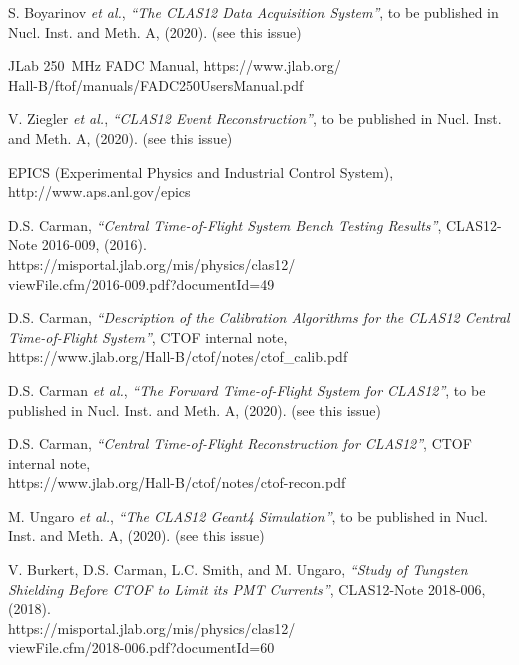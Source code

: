\documentclass[3p,times,twocolumn]{elsarticle}
\begin{document}
\begin{thebibliography}{99}
S. Boyarinov {\it et al.}, {\it ``The CLAS12 Data Acquisition System''}, to be published in Nucl. Inst.
and Meth. A, (2020). (see this issue)
  
JLab 250~MHz FADC Manual, https://www.jlab.org/\\ Hall-B/ftof/manuals/FADC250UsersManual.pdf
  
V. Ziegler {\it et al.}, {\it ``CLAS12 Event Reconstruction''}, to be published in Nucl. Inst.
and Meth. A, (2020). (see this issue)
  
EPICS (Experimental Physics and Industrial Control System), http://www.aps.anl.gov/epics

D.S. Carman, {\it ``Central Time-of-Flight System Bench Testing Results''},
CLAS12-Note 2016-009, (2016).\\
https://misportal.jlab.org/mis/physics/clas12/\\ viewFile.cfm/2016-009.pdf?documentId=49

D.S. Carman, {\it ``Description of the Calibration Algorithms for the CLAS12 Central Time-of-Flight System''},
CTOF internal note, \\
https://www.jlab.org/Hall-B/ctof/notes/ctof\_calib.pdf

D.S. Carman {\it et al.}, {\it ``The Forward Time-of-Flight System for CLAS12''}, to be published in Nucl.
Inst. and Meth. A, (2020). (see this issue)

D.S. Carman, {\it ``Central Time-of-Flight Reconstruction for CLAS12''}, CTOF internal note, \\
https://www.jlab.org/Hall-B/ctof/notes/ctof-recon.pdf

M. Ungaro {\it et al.}, {\it ``The CLAS12 Geant4 Simulation''}, to be published in Nucl. Inst.
and Meth. A, (2020). (see this issue)
  
V. Burkert, D.S. Carman, L.C. Smith, and M. Ungaro, {\it ``Study of Tungsten Shielding Before CTOF to Limit
its PMT Currents''}, CLAS12-Note 2018-006, (2018).\\
https://misportal.jlab.org/mis/physics/clas12/\\ viewFile.cfm/2018-006.pdf?documentId=60

\end{thebibliography}
\end{document}

